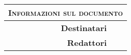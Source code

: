 





\maketitle 
\thispagestyle{empty}





\vspace{2em}


\begin{table}[ht]
  \begin{center}
    \label{tab:Informazioni_Documento}
    \begin{tabular}{r|l}
        \multicolumn{2}{c}{ \textsc{Informazioni sul documento} } \\
        \hline
		\textbf{Destinatari} & \docDestinatari \\
		\textbf{Redattori} & \docRedattori \\
    \end{tabular}
  \end{center}
\end{table}



\vspace{0em}


